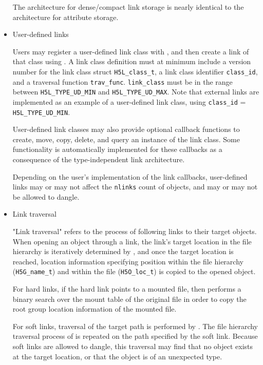 \begin{itemize}
The architecture for dense/compact link storage is nearly identical to the architecture for attribute storage.

    \item User-defined links

Users may register a user-defined link class with , and then create a link of that class using . A link class definition must at minimum include a version number for the link class struct \texttt{H5L\_class\_t}, a link class identifier \texttt{class\_id}, and a traversal function \texttt{trav\_func}. \texttt{link\_class} must be in the range between \texttt{H5L\_TYPE\_UD\_MIN} and \texttt{H5L\_TYPE\_UD\_MAX}. Note that external links are implemented as an example of a user-defined link class, using \texttt{class\_id} = \texttt{H5L\_TYPE\_UD\_MIN}.

User-defined link classes may also provide optional callback functions to create, move, copy, delete, and query an instance of the link class. Some functionality is automatically implemented for these callbacks as a consequence of the type-independent link architecture.

Depending on the user's implementation of the link callbacks, user-defined links may or may not affect the \texttt{nlinks} count of objects, and may or may not be allowed to dangle.

    \item Link traversal

"Link traversal" refers to the process of following links to their target objects. When opening an object through a link, the link's target location in the file hierarchy is iteratively determined by , and once the target location is reached, location information specifying position within the file hierarchy (\texttt{H5G\_name\_t}) and within the file (\texttt{H5O\_loc\_t}) is copied to the opened object.

For hard links, if the hard link points to a mounted file, then  performs a binary search over the mount table of the original file in order to copy the root group location information of the mounted file.

For soft links, traversal of the target path is performed by . The file hierarchy traversal process of  is repeated on the path specified by the soft link. Because soft links are allowed to dangle, this traversal may find that no object exists at the target location, or that the object is of an unexpected type.


\end{itemize}
